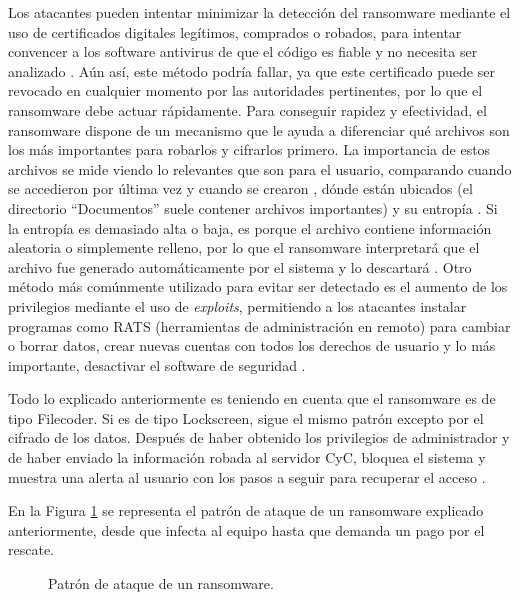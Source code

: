 Los atacantes pueden intentar minimizar la detección del ransomware mediante el uso de certificados digitales legítimos, comprados o robados, para intentar convencer a los software antivirus de que el código es fiable y no necesita ser analizado \cite{39}. Aún así, este método podría fallar, ya que este certificado puede ser revocado en cualquier momento por las autoridades pertinentes, por lo que el ransomware debe actuar rápidamente. Para conseguir rapidez y efectividad, el ransomware dispone de un mecanismo que le ayuda a diferenciar qué archivos son los más importantes para robarlos y cifrarlos primero. La importancia de estos archivos se mide viendo lo relevantes que son para el usuario, comparando cuando se accedieron por última vez y cuando se crearon \cite{33}, dónde están ubicados (el directorio ``Documentos'' suele contener archivos importantes) y su entropía \cite{32}. Si la entropía es demasiado alta o baja, es porque el archivo contiene información aleatoria o simplemente relleno, por lo que el ransomware interpretará que el archivo fue generado automáticamente por el sistema y lo descartará \cite{30}. Otro método más comúnmente utilizado para evitar ser detectado es el aumento de los privilegios mediante el uso de \textit{exploits}, permitiendo a los atacantes instalar programas como \gls{RATS} (herramientas de administración en remoto) para cambiar o borrar datos, crear nuevas cuentas con todos los derechos de usuario y lo más importante, desactivar el software de seguridad \cite{39}.

Todo lo explicado anteriormente es teniendo en cuenta que el ransomware es de tipo Filecoder. Si es de tipo Lockscreen, sigue el mismo patrón excepto por el cifrado de los datos. Después de haber obtenido los privilegios de administrador y de haber enviado la información robada al servidor \gls{CyC}, bloquea el sistema y muestra una alerta al usuario con los pasos a seguir para recuperar el acceso \cite{35}. 

En la Figura \ref{fig:imstages} se representa el patrón de ataque de un ransomware explicado anteriormente, desde que infecta al equipo hasta que demanda un pago por el rescate. 

\begin{figure}[h!]
\begin{center}
{}
\end{center}
\caption{Patrón de ataque de un ransomware.}
\label{fig:imstages}
\end{figure}



